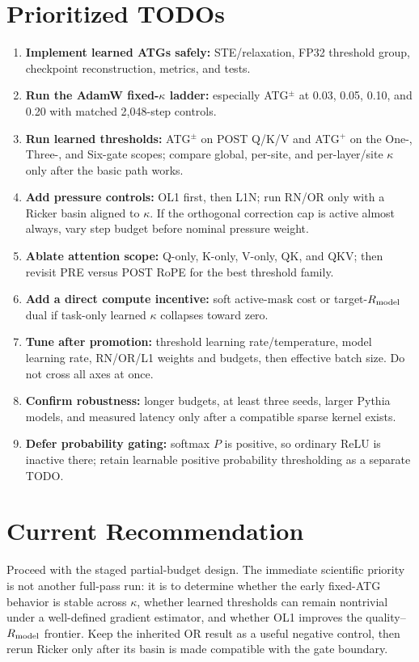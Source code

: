 \documentclass[10pt]{article}
\newcommand{\tightsection}[1]{\section{#1}\vspace{-0.35em}}
\newcommand{\Rmodel}{R_{\rm model}}
\begin{document}
\tightsection{Prioritized TODOs}

\begin{enumerate}
\item \textbf{Implement learned ATGs safely:} STE/relaxation, FP32 threshold group, checkpoint reconstruction, metrics, and tests.
\item \textbf{Run the AdamW fixed-$\kappa$ ladder:} especially ATG$^{\pm}$ at 0.03, 0.05, 0.10, and 0.20 with matched 2,048-step controls.
\item \textbf{Run learned thresholds:} ATG$^{\pm}$ on POST Q/K/V and ATG$^+$ on the One-, Three-, and Six-gate scopes; compare global, per-site, and per-layer/site $\kappa$ only after the basic path works.
\item \textbf{Add pressure controls:} OL1 first, then L1N; run RN/OR only with a Ricker basin aligned to $\kappa$. If the orthogonal correction cap is active almost always, vary step budget before nominal pressure weight.
\item \textbf{Ablate attention scope:} Q-only, K-only, V-only, QK, and QKV; then revisit PRE versus POST RoPE for the best threshold family.
\item \textbf{Add a direct compute incentive:} soft active-mask cost or target-$\Rmodel$ dual if task-only learned $\kappa$ collapses toward zero.
\item \textbf{Tune after promotion:} threshold learning rate/temperature, model learning rate, RN/OR/L1 weights and budgets, then effective batch size. Do not cross all axes at once.
\item \textbf{Confirm robustness:} longer budgets, at least three seeds, larger Pythia models, and measured latency only after a compatible sparse kernel exists.
\item \textbf{Defer probability gating:} softmax $P$ is positive, so ordinary ReLU is inactive there; retain learnable positive probability thresholding as a separate TODO.
\end{enumerate}

\tightsection{Current Recommendation}

Proceed with the staged partial-budget design. The immediate scientific priority is not another full-pass run: it is to determine whether the early fixed-ATG behavior is stable across $\kappa$, whether learned thresholds can remain nontrivial under a well-defined gradient estimator, and whether OL1 improves the quality--$\Rmodel$ frontier. Keep the inherited OR result as a useful negative control, then rerun Ricker only after its basin is made compatible with the gate boundary.
\end{document}
